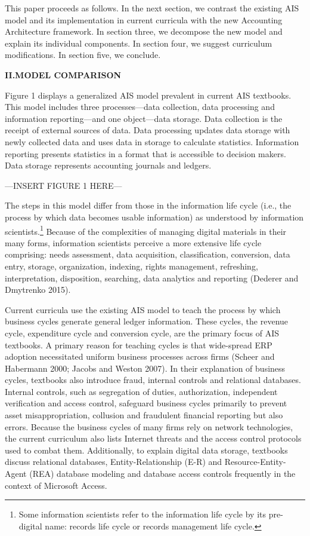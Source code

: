 \documentclass[12pt]{article}
\newcommand{\Section}[2]{\vspace{.2in}\centerline{\normalsize{}\textbf{#1\quad{}\MakeUppercase{#2}}}\nopagebreak{}\smallskip{}\indent{}}
\newcommand{\InsertGraphic}[1]{\vspace{.1in}\noindent{}\centerline{\MakeUppercase{---\quad{}Insert #1 here\quad{}---}}\vspace{.1in}}
\begin{document}
This paper proceeds as follows. In the next section, we contrast the existing AIS model and its implementation in current curricula with the new Accounting Architecture framework. In section three, we decompose the new model and explain its individual components. In section four, we suggest curriculum modifications. In section five, we conclude.

\Section{II.}{Model Comparison}
Figure 1 displays a generalized AIS model prevalent in current AIS textbooks. This model includes three processes---data collection, data processing and information reporting---and one object---data storage. Data collection is the receipt of external sources of data. Data processing updates data storage with newly collected data and uses data in storage to calculate statistics. Information reporting presents statistics in a format that is accessible to decision makers. Data storage represents accounting journals and ledgers.

\InsertGraphic{Figure 1}

The steps in this model differ from those in the information life cycle (i.e., the process by which data becomes usable information) as understood by information scientists.\footnote{Some information scientists refer to the information life cycle by its pre-digital name: records life cycle or records management life cycle.} Because of the complexities of managing digital materials in their many forms, information scientists perceive a more extensive life cycle comprising: needs assessment, data acquisition, classification, conversion, data entry, storage, organization, indexing, rights management, refreshing, interpretation, disposition, searching, data analytics and reporting (Dederer and Dmytrenko 2015).

Current curricula use the existing AIS model to teach the process by which business cycles generate general ledger information. These cycles, the revenue cycle, expenditure cycle and conversion cycle, are the primary focus of AIS textbooks. A primary reason for teaching cycles is that wide-spread ERP adoption necessitated uniform business processes across firms (Scheer and Habermann 2000; Jacobs and Weston 2007). In their explanation of business cycles, textbooks also introduce fraud, internal controls and relational databases. Internal controls, such as segregation of duties, authorization, independent verification and access control, safeguard business cycles primarily to prevent asset misappropriation, collusion and fraudulent financial reporting but also errors. Because the business cycles of many firms rely on network technologies, the current curriculum also lists Internet threats and the access control protocols used to combat them. Additionally, to explain digital data storage, textbooks discuss relational databases, Entity-Relationship (E-R) and Resource-Entity-Agent (REA) database modeling and database access controls frequently in the context of Microsoft Access.
\end{document}
